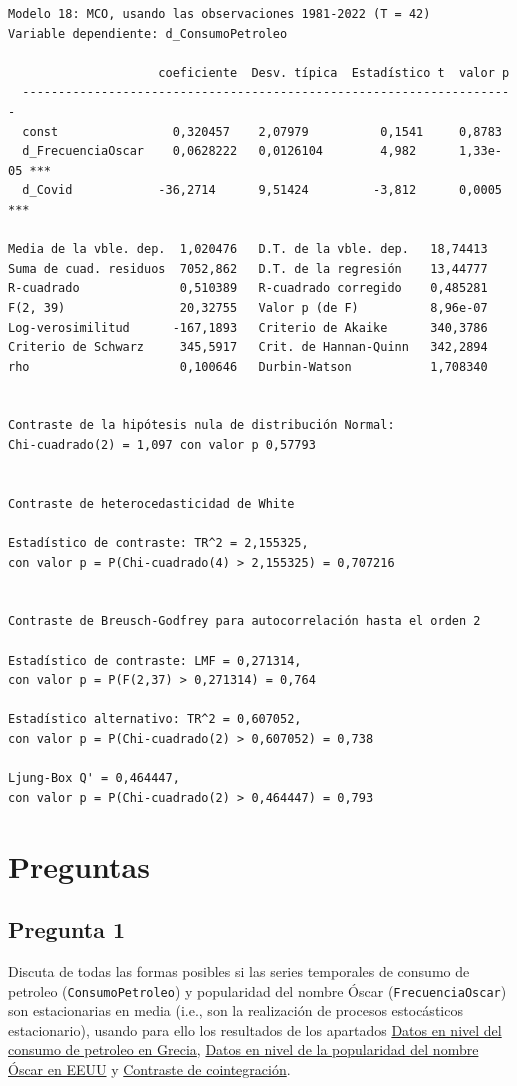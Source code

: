 \documentclass[10pt]{article}
\begin{document}
\begin{verbatim}
Modelo 18: MCO, usando las observaciones 1981-2022 (T = 42)
Variable dependiente: d_ConsumoPetroleo

                     coeficiente  Desv. típica  Estadístico t  valor p 
  ---------------------------------------------------------------------
  const                0,320457    2,07979          0,1541     0,8783  
  d_FrecuenciaOscar    0,0628222   0,0126104        4,982      1,33e-05 ***
  d_Covid            -36,2714      9,51424         -3,812      0,0005   ***

Media de la vble. dep.  1,020476   D.T. de la vble. dep.   18,74413
Suma de cuad. residuos  7052,862   D.T. de la regresión    13,44777
R-cuadrado              0,510389   R-cuadrado corregido    0,485281
F(2, 39)                20,32755   Valor p (de F)          8,96e-07
Log-verosimilitud      -167,1893   Criterio de Akaike      340,3786
Criterio de Schwarz     345,5917   Crit. de Hannan-Quinn   342,2894
rho                     0,100646   Durbin-Watson           1,708340


Contraste de la hipótesis nula de distribución Normal:
Chi-cuadrado(2) = 1,097 con valor p 0,57793


Contraste de heterocedasticidad de White

Estadístico de contraste: TR^2 = 2,155325,
con valor p = P(Chi-cuadrado(4) > 2,155325) = 0,707216


Contraste de Breusch-Godfrey para autocorrelación hasta el orden 2

Estadístico de contraste: LMF = 0,271314,
con valor p = P(F(2,37) > 0,271314) = 0,764

Estadístico alternativo: TR^2 = 0,607052,
con valor p = P(Chi-cuadrado(2) > 0,607052) = 0,738

Ljung-Box Q' = 0,464447,
con valor p = P(Chi-cuadrado(2) > 0,464447) = 0,793
\end{verbatim}
\section*{Preguntas}
\label{sec:org2dfada6}

\subsection*{Pregunta 1}
\label{sec:org54f35a6}

Discuta de todas las formas posibles si las series temporales de
consumo de petroleo (\texttt{ConsumoPetroleo}) y popularidad del nombre Óscar
(\texttt{FrecuenciaOscar}) son estacionarias en media (i.e., son la
realización de procesos estocásticos estacionario), usando para ello
los resultados de los apartados \hyperref[sec:org38d97da]{Datos en nivel del consumo de petroleo en Grecia}, \hyperref[sec:org1da4596]{Datos en nivel de la popularidad del nombre Óscar en EEUU} y
\hyperref[sec:org21dd2ed]{Contraste de cointegración}.
\end{document}
